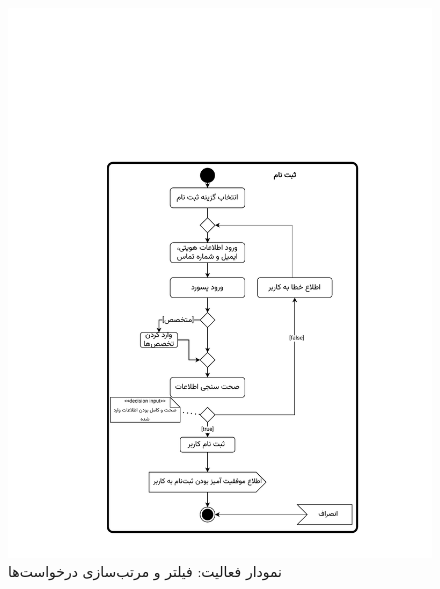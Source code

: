 \begin{figure}
	\centering
	\includegraphics[scale=0.8, page=10]{figs/OOD-activity1-10.pdf}
	\caption{نمودار فعالیت: فیلتر و مرتب‌سازی درخواست‌ها}
\end{figure}
\FloatBarrier
\newpage

